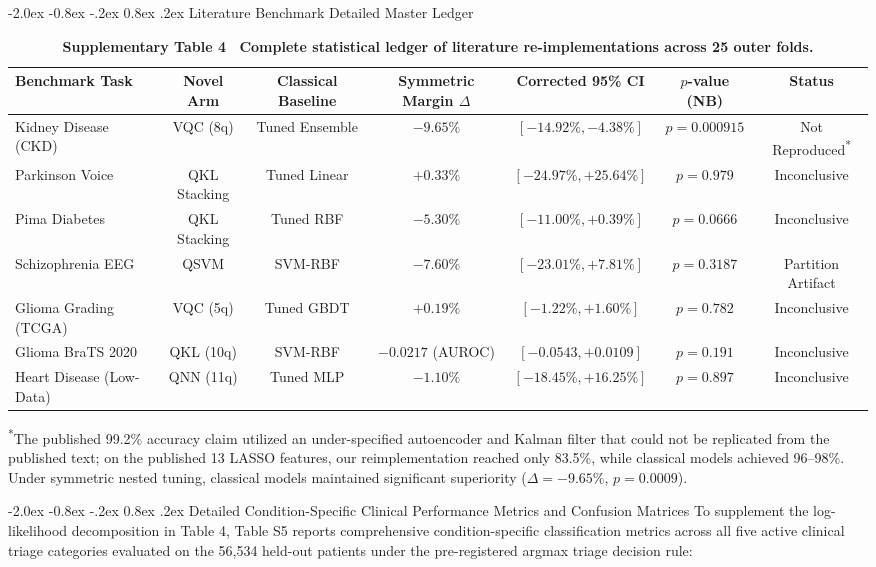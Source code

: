\documentclass[10pt,a4paper]{article}
\makeatletter
\renewcommand{\subsection}{\@startsection{subsection}{2}{\z@}%
  {-2.0ex \@plus -0.8ex \@minus -.2ex}%
  {0.8ex \@plus.2ex}%
  {\normalfont\large\sffamily\bfseries\color{naturedark}}}
\makeatother
\begin{document}
\subsection{Literature Benchmark Detailed Master Ledger}
\begin{table}[h]
\centering
\scriptsize
\caption*{\textbf{\textsf{Supplementary Table 4 \textbar\ Complete statistical ledger of literature re-implementations across 25 outer folds.}}}
\begin{tabular}{lcccccc}
\toprule
\textbf{Benchmark Task} & \textbf{Novel Arm} & \textbf{Classical Baseline} & \textbf{Symmetric Margin $\Delta$} & \textbf{Corrected 95\% CI} & \textbf{$p$-value (NB)} & \textbf{Status} \\
\midrule
Kidney Disease (CKD) & VQC (8q) & Tuned Ensemble & $-9.65\%$ & $[-14.92\%, -4.38\%]$ & $p = 0.000915$ & Not Reproduced\textsuperscript{*} \\
Parkinson Voice & QKL Stacking & Tuned Linear & $+0.33\%$ & $[-24.97\%, +25.64\%]$ & $p = 0.979$ & Inconclusive \\
Pima Diabetes & QKL Stacking & Tuned RBF & $-5.30\%$ & $[-11.00\%, +0.39\%]$ & $p = 0.0666$ & Inconclusive \\
Schizophrenia EEG & QSVM & SVM-RBF & $-7.60\%$ & $[-23.01\%, +7.81\%]$ & $p = 0.3187$ & Partition Artifact \\
Glioma Grading (TCGA) & VQC (5q) & Tuned GBDT & $+0.19\%$ & $[-1.22\%, +1.60\%]$ & $p = 0.782$ & Inconclusive \\
Glioma BraTS 2020 & QKL (10q) & SVM-RBF & $-0.0217$ (AUROC) & $[-0.0543, +0.0109]$ & $p = 0.191$ & Inconclusive \\
Heart Disease (Low-Data) & QNN (11q) & Tuned MLP & $-1.10\%$ & $[-18.45\%, +16.25\%]$ & $p = 0.897$ & Inconclusive \\
\bottomrule
\end{tabular}
\vspace{2pt}
\begin{flushleft}
\scriptsize\textsuperscript{*}The published 99.2\% accuracy claim utilized an under-specified autoencoder and Kalman filter that could not be replicated from the published text; on the published 13 LASSO features, our reimplementation reached only 83.5\%, while classical models achieved 96--98\%. Under symmetric nested tuning, classical models maintained significant superiority ($\Delta = -9.65\%$, $p = 0.0009$).
\end{flushleft}
\end{table}


\subsection{Detailed Condition-Specific Clinical Performance Metrics and Confusion Matrices}
To supplement the log-likelihood decomposition in Table 4, Table S5 reports comprehensive condition-specific classification metrics across all five active clinical triage categories evaluated on the 56,534 held-out patients under the pre-registered argmax triage decision rule:
\end{document}

